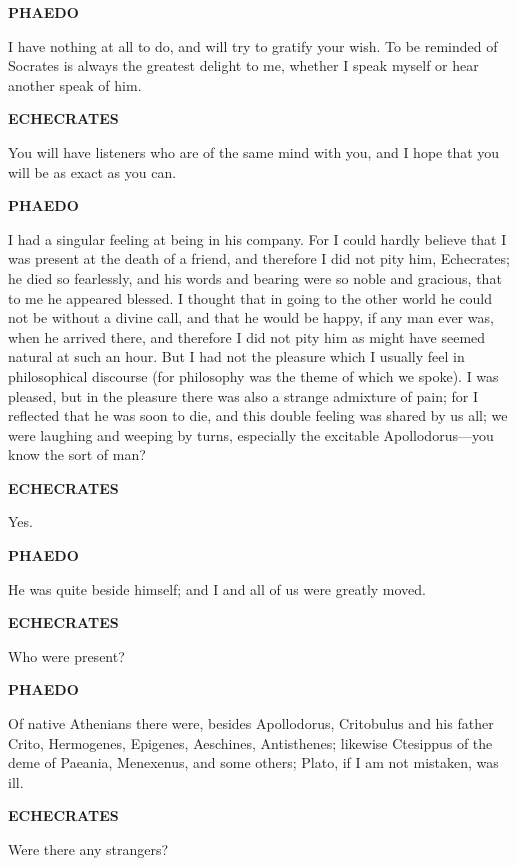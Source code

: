 \documentclass[11pt,letter]{article}
\begin{document}
\par \textbf{PHAEDO}
\par   I have nothing at all to do, and will try to gratify your wish. To be reminded of Socrates is always the greatest delight to me, whether I speak myself or hear another speak of him.

\par \textbf{ECHECRATES}
\par   You will have listeners who are of the same mind with you, and I hope that you will be as exact as you can.

\par \textbf{PHAEDO}
\par   I had a singular feeling at being in his company. For I could hardly believe that I was present at the death of a friend, and therefore I did not pity him, Echecrates; he died so fearlessly, and his words and bearing were so noble and gracious, that to me he appeared blessed. I thought that in going to the other world he could not be without a divine call, and that he would be happy, if any man ever was, when he arrived there, and therefore I did not pity him as might have seemed natural at such an hour. But I had not the pleasure which I usually feel in philosophical discourse (for philosophy was the theme of which we spoke). I was pleased, but in the pleasure there was also a strange admixture of pain; for I reflected that he was soon to die, and this double feeling was shared by us all; we were laughing and weeping by turns, especially the excitable Apollodorus—you know the sort of man?

\par \textbf{ECHECRATES}
\par   Yes.

\par \textbf{PHAEDO}
\par   He was quite beside himself; and I and all of us were greatly moved.

\par \textbf{ECHECRATES}
\par   Who were present?

\par \textbf{PHAEDO}
\par   Of native Athenians there were, besides Apollodorus, Critobulus and his father Crito, Hermogenes, Epigenes, Aeschines, Antisthenes; likewise Ctesippus of the deme of Paeania, Menexenus, and some others; Plato, if I am not mistaken, was ill.

\par \textbf{ECHECRATES}
\par   Were there any strangers?
\end{document}
